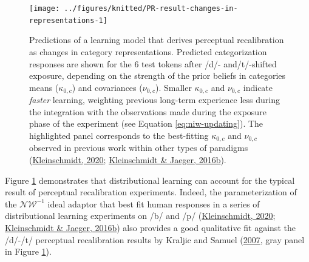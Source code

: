 \documentclass[
  11pt,
  man,floatsintext]{apa6}
\begin{document}
\begin{figure}

{\centering \texttt{[image: ../figures/knitted/PR-result-changes-in-representations-1]} 

}

\caption{Predictions of a learning model that derives perceptual recalibration as changes in category representations. Predicted categorization responses are shown for the 6 test tokens after /d/- and/t/-shifted exposure, depending on the strength of the prior beliefs in categories means (\(\kappa_{0,c}\)) and covariances (\(\nu_{0,c}\)). Smaller \(\kappa_{0,c}\) and \(\nu_{0,c}\) indicate \emph{faster} learning, weighting previous long-term experience less during the integration with the observations made during the exposure phase of the experiment (see Equation \eqref{eq:niw-updating}). The highlighted panel corresponds to the best-fitting \(\kappa_{0,c}\) and \(\nu_{0,c}\) observed in previous work within other types of paradigms (\protect\hyperlink{ref-kleinschmidt2020}{Kleinschmidt, 2020}; \protect\hyperlink{ref-kleinschmidt-jaeger2016cogsci}{Kleinschmidt \& Jaeger, 2016b}).}\label{fig:PR-result-changes-in-representations}
\end{figure}

Figure \ref{fig:PR-result-changes-in-representations} demonstrates that distributional learning can account for the typical result of perceptual recalibration experiments. Indeed, the parameterization of the \(\mathcal{NW}^{-1}\) ideal adaptor that best fit human responses in a series of distributional learning experiments on /b/ and /p/ (\protect\hyperlink{ref-kleinschmidt2020}{Kleinschmidt, 2020}; \protect\hyperlink{ref-kleinschmidt-jaeger2016cogsci}{Kleinschmidt \& Jaeger, 2016b}) also provides a good qualitative fit against the /d/-/t/ perceptual recalibration results by Kraljic and Samuel (\protect\hyperlink{ref-kraljic-samuel2007}{2007}, gray panel in Figure \ref{fig:PR-result-changes-in-representations}).
\end{document}
